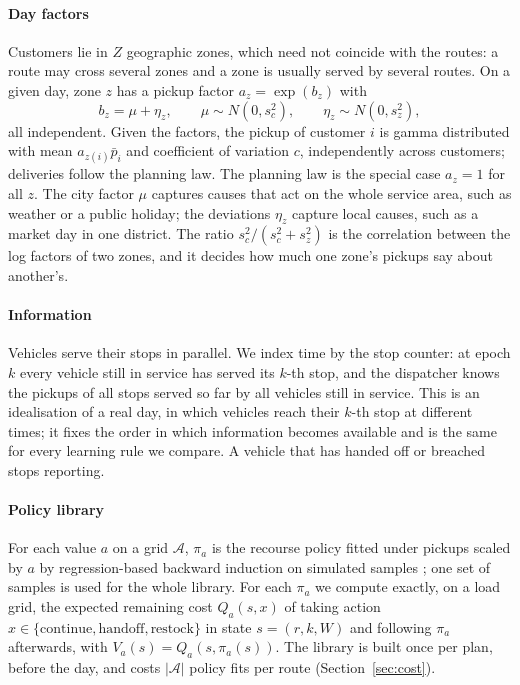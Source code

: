 \documentclass[preprint,authoryear,12pt]{elsarticle}
\begin{document}
\paragraph{Day factors} Customers lie in $Z$ geographic zones, which
need not coincide with the routes: a route may cross several zones and a
zone is usually served by several routes. On a given day, zone $z$ has
a pickup factor $a_z = \exp(b_z)$ with
\begin{equation}\label{eq:factor}
b_z = \mu + \eta_z, \qquad \mu \sim N(0, s_c^2), \qquad
\eta_z \sim N(0, s_z^2),
\end{equation}
all independent. Given the factors, the pickup of customer $i$ is gamma
distributed with mean $a_{z(i)} \bar p_i$ and coefficient of variation
$c$, independently across customers; deliveries follow the planning
law. The planning law is the special case $a_z = 1$ for all $z$. The
city factor $\mu$ captures causes that act on the whole service area,
such as weather or a public holiday; the deviations $\eta_z$ capture
local causes, such as a market day in one district. The ratio
$s_c^2/(s_c^2+s_z^2)$ is the correlation between the log factors of two
zones, and it decides how much one zone's pickups say about another's.

\paragraph{Information} Vehicles serve their stops in parallel. We
index time by the stop counter: at epoch $k$ every vehicle still in
service has served its $k$-th stop, and the dispatcher knows the
pickups of all stops served so far by all vehicles still in service.
This is an idealisation of a real day, in which vehicles reach their
$k$-th stop at different times; it fixes the order in which information
becomes available and is the same for every learning rule we compare.
A vehicle that has handed off or breached stops reporting.

\paragraph{Policy library} For each value $a$ on a grid $\mathcal{A}$,
$\pi_a$ is the recourse policy fitted under pickups scaled by $a$ by
regression-based backward induction on simulated samples
\citep{dang2026baton}; one set of samples is used for the whole
library. For each $\pi_a$ we compute exactly, on a load grid, the
expected remaining cost $Q_a(s,x)$ of taking action
$x \in \{\text{continue},\text{handoff},\text{restock}\}$ in state
$s=(r,k,W)$ and following $\pi_a$ afterwards, with $V_a(s) =
Q_a(s,\pi_a(s))$. The library is built once per plan, before the day,
and costs $|\mathcal{A}|$ policy fits per route
(Section~\ref{sec:cost}).
\end{document}
